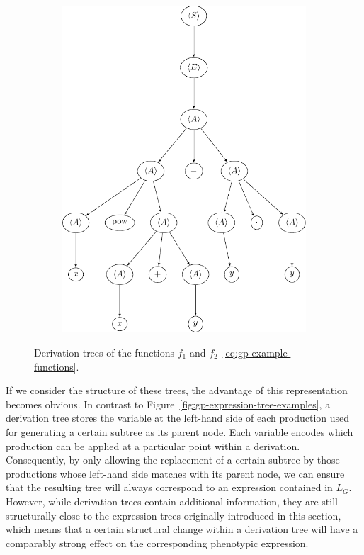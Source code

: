 \begin{figure}[h]
\begin{subfigure}{0.41\textwidth}
	\includegraphics[scale=0.46]{figures/trees/gp_derivation_tree2.pdf}
	\end{subfigure}
	\caption{Derivation trees of the functions $f_1$ and $f_2$~\eqref{eq:gp-example-functions}.}
	\label{fig:gp-derivation-tree-examples}
\end{figure}
If we consider the structure of these trees, the advantage of this representation becomes obvious.
In contrast to Figure~\ref{fig:gp-expression-tree-examples}, a derivation tree stores the variable at the left-hand side of each production used for generating a certain subtree as its parent node.
Each variable encodes which production can be applied at a particular point within a derivation.
Consequently, by only allowing the replacement of a certain subtree by those productions whose left-hand side matches with its parent node, we can ensure that the resulting tree will always correspond to an expression contained in $L_G$. 
However, while derivation trees contain additional information, they are still structurally close to the expression trees originally introduced in this section, which means that a certain structural change within a derivation tree will have a comparably strong effect on the corresponding phenotypic expression.
